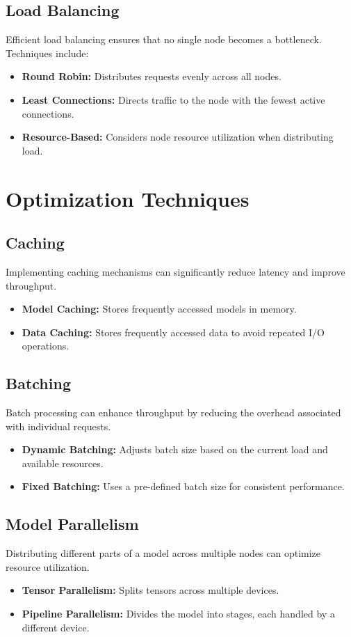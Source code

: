 \subsection{Load Balancing}
Efficient load balancing ensures that no single node becomes a bottleneck. Techniques include:
\begin{itemize}
    \item \textbf{Round Robin:} Distributes requests evenly across all nodes.
    \item \textbf{Least Connections:} Directs traffic to the node with the fewest active connections.
    \item \textbf{Resource-Based:} Considers node resource utilization when distributing load.
\end{itemize}

\section{Optimization Techniques}

\subsection{Caching}
Implementing caching mechanisms can significantly reduce latency and improve throughput.
\begin{itemize}
    \item \textbf{Model Caching:} Stores frequently accessed models in memory.
    \item \textbf{Data Caching:} Stores frequently accessed data to avoid repeated I/O operations.
\end{itemize}

\subsection{Batching}
Batch processing can enhance throughput by reducing the overhead associated with individual requests.
\begin{itemize}
    \item \textbf{Dynamic Batching:} Adjusts batch size based on the current load and available resources.
    \item \textbf{Fixed Batching:} Uses a pre-defined batch size for consistent performance.
\end{itemize}

\subsection{Model Parallelism}
Distributing different parts of a model across multiple nodes can optimize resource utilization.
\begin{itemize}
    \item \textbf{Tensor Parallelism:} Splits tensors across multiple devices.
    \item \textbf{Pipeline Parallelism:} Divides the model into stages, each handled by a different device.
\end{itemize}

